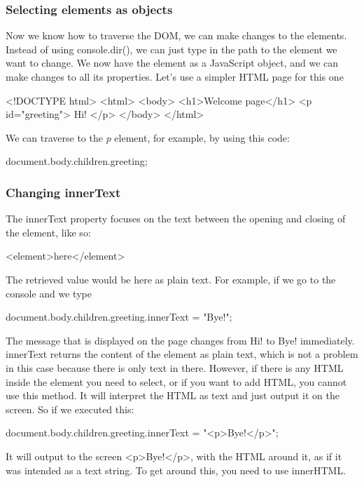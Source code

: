 \documentclass{report}
\begin{document}
\begin{jscode}
\subsubsection{Selecting elements as objects}
\bigbreak \noindent 
Now we know how to traverse the DOM, we can make changes to the elements.
Instead of using console.dir(), we can just type in the path to the element we want
to change. We now have the element as a JavaScript object, and we can make changes
to all its properties. Let's use a simpler HTML page for this one
\bigbreak \noindent 
\begin{htmlcode}
    <!DOCTYPE html>
    <html>
        <body>
            <h1>Welcome page</h1>
            <p id="greeting"> Hi! </p>
        </body>
    </html>
\end{htmlcode}
\bigbreak \noindent 
We can traverse to the $p$ element, for example, by using this code:
\bigbreak \noindent 
\begin{jscode}
document.body.children.greeting;
\end{jscode}

\bigbreak \noindent 
\subsubsection{Changing innerText}
\bigbreak \noindent 
The innerText property focuses on the text between the opening and closing of the element, like so:
\bigbreak \noindent 
\begin{htmlcode}
<element>here</element>
\end{htmlcode}
\bigbreak \noindent 
The retrieved value would be here as plain text. For example, if we go to the console and we type
\bigbreak \noindent 
\begin{jscode}
document.body.children.greeting.innerText = "Bye!";
\end{jscode}
\bigbreak \noindent 
The message that is displayed on the page changes from Hi! to Bye! immediately.
innerText returns the content of the element as plain text, which is not a problem in
this case because there is only text in there. However, if there is any HTML inside
the element you need to select, or if you want to add HTML, you cannot use this
method. It will interpret the HTML as text and just output it on the screen. So if we
executed this:
\bigbreak \noindent 
\begin{jscode}
document.body.children.greeting.innerText = "<p>Bye!</p>";
\end{jscode}
\bigbreak \noindent 
It will output to the screen <p>Bye!</p>, with the HTML around it, as if it was intended as a text string. To get around this, you need to use innerHTML.


\end{jscode}
\end{document}
